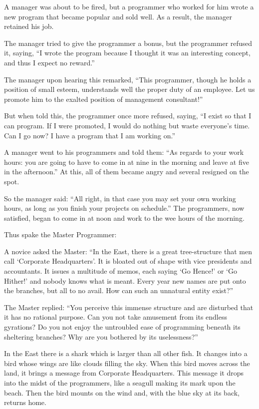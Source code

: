 A manager was about to be fired, but a programmer who worked for him wrote a new program that became popular and sold well. As a result, the manager retained his job.

The manager tried to give the programmer a bonus, but the programmer refused it, saying, ``I wrote the program because I thought it was an interesting concept, and thus I expect no reward.''

The manager upon hearing this remarked, ``This programmer, though he holds a position of small esteem, understands well the proper duty of an employee. Let us promote him to the exalted position of management consultant!''

But when told this, the programmer once more refused, saying, ``I exist so that I can program. If I were promoted, I would do nothing but waste everyone's time. Can I go now? I have a program that I am working on.''

A manager went to his programmers and told them: ``As regards to your work hours: you are going to have to come in at nine in the morning and leave at five in the afternoon.'' At this, all of them became angry and several resigned on the spot.

So the manager said: ``All right, in that case you may set your own working hours, as long as you finish your projects on schedule.'' The programmers, now satisfied, began to come in at noon and work to the wee hours of the morning.

Thus spake the Master Programmer:

A novice asked the Master: ``In the East, there is a great tree-structure that men call `Corporate Headquarters'. It is bloated out of shape with vice presidents and accountants. It issues a multitude of memos, each saying `Go Hence!' or `Go Hither!' and nobody knows what is meant. Every year new names are put onto the branches, but all to no avail. How can such an unnatural entity exist?''

The Master replied: ``You perceive this immense structure and are disturbed that it has no rational purpose. Can you not take amusement from its endless gyrations? Do you not enjoy the untroubled ease of programming beneath its sheltering branches? Why are you bothered by its uselessness?''

In the East there is a shark which is larger than all other fish. It changes into a bird whose wings are like clouds filling the sky. When this bird moves across the land, it brings a message from Corporate Headquarters. This message it drops into the midst of the programmers, like a seagull making its mark upon the beach. Then the bird mounts on the wind and, with the blue sky at its back, returns home.

